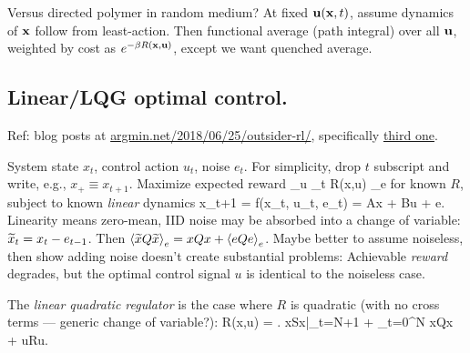 \documentclass[notitlepage,openany,11pt]{report}
\numberwithin{equation}{section}
\theoremstyle{plain}%
\begin{document}
Versus directed polymer in random medium? At fixed $\mathbf{u}(\mathbf{x},t)$, assume dynamics of $\mathbf{x}$ follow from least-action. Then functional average (path integral) over all $\mathbf{u}$, weighted by cost as $e^{-\beta R(\mathbf{x},\mathbf{u})}$, except we want quenched average.


\subsection{Linear/LQG optimal control.}

Ref: blog posts at \href{http://www.argmin.net/2018/06/25/outsider-rl/}{argmin.net/2018/06/25/outsider-rl/}, specifically \href{http://www.argmin.net/2018/02/08/lqr/}{third one}.

System state $x_{t}$, control action $u_{t}$, noise $e_{t}$. For simplicity, drop $t$ subscript and write, e.g., $x_{+} \equiv x_{t+1}$. Maximize expected reward
\be
\arg \max_{u} \left\langle \sum_{t} R(x,u) \right\rangle_{e}
\ee
for known $R$, subject to known \emph{linear} dynamics
\be
x_{t+1} = f(x_{t}, u_{t}, e_{t}) = Ax + Bu + e.
\ee
Linearity means zero-mean, IID noise may be absorbed into a change of variable: $\widetilde{x}_{t} = x_{t} - e_{t-1}$. Then $\left\langle \widetilde{x} Q \widetilde{x} \right\rangle_{e} = xQx + \left\langle e Q e \right\rangle_{e}$. Maybe better to assume noiseless, then show adding noise doesn't create substantial problems: Achievable \emph{reward} degrades, but the optimal control signal $u$ is identical to the noiseless case.

The \emph{linear quadratic regulator} is the case where $R$ is quadratic (with no cross terms --- generic change of variable?):
\be
R(x,u) = \left. xSx\right|_{t=N+1} +  \sum_{t=0}^{N} xQx + uRu.
\ee
{}
\end{document}
